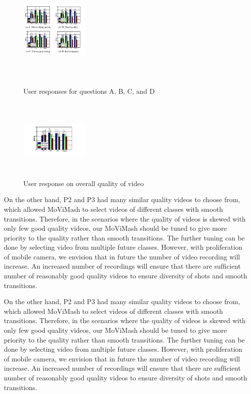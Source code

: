 \documentclass{sig-alternate}
\begin{document}
\begin{figure}[!htb]
\centering
\includegraphics[width=0.3\textwidth ,height = 6cm]{image7}
\caption{User responses for questions A, B, C, and D}
\label{fig:figure7}
\end{figure}

\begin{figure}[!htb]
\centering
\includegraphics[width=0.3\textwidth ,height = 4cm]{image8}
\caption{User response on overall quality of video}
\label{fig:figure1}
\end{figure}

On the other hand, P2 and P3 had many similar quality videos to choose from, which allowed MoViMash to select videos of different classes with smooth transitions. Therefore, in the scenarios where the quality of videos is skewed with only few good quality videos, our MoViMash should be tuned to give more priority to the quality rather than smooth transitions. The further tuning can be done by selecting video from multiple future classes. However, with proliferation of mobile camera, we envision that in future the number of video recording will increase. An increased number of recordings will ensure that there are sufﬁcient number of reasonably good quality videos to ensure diversity of shots and smooth transitions. 

On the other hand, P2 and P3 had many similar quality videos to choose from, which allowed MoViMash to select videos of different classes with smooth transitions. Therefore, in the scenarios where the quality of videos is skewed with only few good quality videos, our MoViMash should be tuned to give more priority to the quality rather than smooth transitions. The further tuning can be done by selecting video from multiple future classes. However, with proliferation of mobile camera, we envision that in future the number of video recording will increase. An increased number of recordings will ensure that there are sufﬁcient number of reasonably good quality videos to ensure diversity of shots and smooth transitions. 
\end{document}

